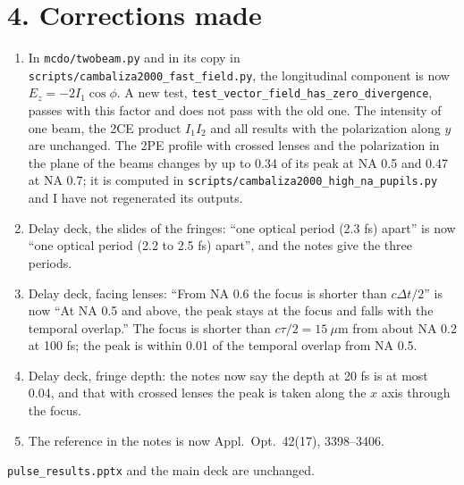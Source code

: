 \documentclass[10pt]{article}
\begin{document}
\section*{4. Corrections made}
\begin{enumerate}
\item In \texttt{mcdo/twobeam.py} and in its copy in \texttt{scripts/cambaliza2000\_fast\_field.py}, the
longitudinal component is now $E_z = -2I_1\cos\phi$. A new test,
\texttt{test\_vector\_field\_has\_zero\_divergence}, passes with this factor and does not pass with the old one.
The intensity of one beam, the 2CE product $I_1I_2$ and all results with the polarization along $y$ are unchanged.
The 2PE profile with crossed lenses and the polarization in the plane of the beams changes by up to 0.34 of its
peak at NA 0.5 and 0.47 at NA 0.7; it is computed in \texttt{scripts/cambaliza2000\_high\_na\_pupils.py} and I
have not regenerated its outputs.
\item Delay deck, the slides of the fringes: ``one optical period (2.3 fs) apart'' is now ``one optical period
(2.2 to 2.5 fs) apart'', and the notes give the three periods.
\item Delay deck, facing lenses: ``From NA 0.6 the focus is shorter than $c\Delta t/2$'' is now ``At NA 0.5 and
above, the peak stays at the focus and falls with the temporal overlap.'' The focus is shorter than
$c\tau/2 = 15\ \mu$m from about NA 0.2 at 100 fs; the peak is within 0.01 of the temporal overlap from NA 0.5.
\item Delay deck, fringe depth: the notes now say the depth at 20 fs is at most 0.04, and that with crossed lenses
the peak is taken along the $x$ axis through the focus.
\item The reference in the notes is now Appl.\ Opt.\ 42(17), 3398--3406.
\end{enumerate}
\texttt{pulse\_results.pptx} and the main deck are unchanged.
\end{document}
